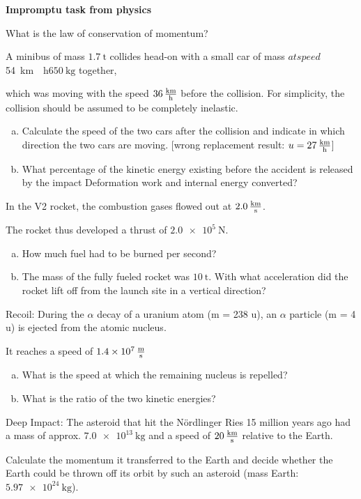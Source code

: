 \documentclass[a4paper]{article}
\begin{document}
	{\bf Impromptu task from physics }\\
	\begin{enumerate}[1.]
		{\bf \item What is the law of conservation of momentum?}
		{\bf \item A minibus of mass $\SI{1.7}{\tonne}$ collides head-on with a small car of mass $ at speed $\SI{54}{\kilo\meter\over \hour}$ \SI{650}{\kilogram}$ together,} which was moving with the speed $\SI{36}{\kilo\meter\over \hour}$ before the collision. For simplicity, the collision should be assumed to be completely inelastic.
		
		\begin{enumerate}[a)]
			\item Calculate the speed of the two cars after the collision and indicate in which direction the two cars are moving. [wrong replacement result: $ u= \SI{27}{\kilo\meter\over \hour}$]
			\item What percentage of the kinetic energy existing before the accident is released by the impact
			Deformation work and internal energy converted?
		\end{enumerate}
		
		{\bf \item In the V2 rocket, the combustion gases flowed out at $\SI{2.0}{\kilo\meter\over \second}$.} The rocket thus developed a thrust of $\SI{2.0e5 }{\newton}$.
		
		\begin{enumerate}[a)]
			\item How much fuel had to be burned per second?
			\item The mass of the fully fueled rocket was $\SI{10}{\tonne}$. With what acceleration did the rocket lift off from the launch site in a vertical direction?
		\end{enumerate}
		
		{\bf \item Recoil: During the $\alpha$ decay of a uranium atom (m = 238 u), an $\alpha$ particle (m = 4 u) is ejected from the atomic nucleus.}
		It reaches a speed of $\SI{1.4e7}{\meter\over \second}$
		\begin{enumerate}[a)]
			\item What is the speed at which the remaining nucleus is repelled?
			\item What is the ratio of the two kinetic energies?
		\end{enumerate}
		
		
		{\bf \item Deep Impact: The asteroid that hit the Nördlinger Ries 15 million years ago had a mass of approx. $\SI{7.0e13}{\kilogram}$ and a speed of
			$\SI{20}{\kilo\meter\over \second}$ relative to the Earth.} Calculate the momentum it transferred to the Earth and decide whether the Earth could be thrown off its orbit by such an asteroid (mass Earth: $\SI{5.97e24}{\kilogram}$).
		

\end{enumerate}
\end{document}
